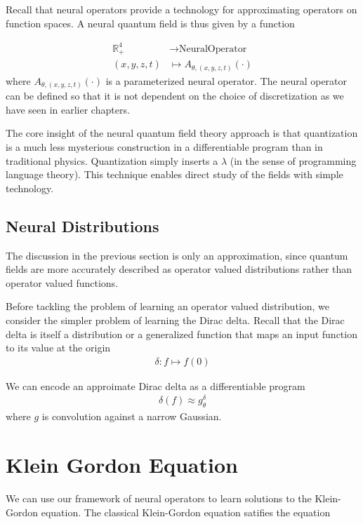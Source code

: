 \documentclass[book.tex]{subfiles}
\begin{document}
Recall that neural operators provide a technology for approximating operators on function spaces. A neural quantum field is thus given by a function

\begin{align}
    \mathbb{R}^4_+ &\to \textrm{NeuralOperator} \\
    (x, y, z, t) &\mapsto A_{\theta, (x,y,z, t)}(\cdot)
\end{align}
where $A_{\theta, (x,y,z, t)}(\cdot)$ is a parameterized neural operator. The neural operator can be defined so that it is not dependent on the choice of discretization as we have seen in earlier chapters.

The core insight of the neural quantum field theory approach is that quantization is a much less mysterious construction in a differentiable program than in traditional physics. Quantization simply inserts a $\lambda$ (in the sense of programming language theory). This technique enables direct study of the fields with simple technology.

\subsection{Neural Distributions}
The discussion in the previous section is only an approximation, since quantum fields are more accurately described as operator valued distributions rather than operator valued functions. 

Before tackling the problem of learning an operator valued distribution, we consider the simpler problem of learning the Dirac delta. Recall that the Dirac delta is itself a distribution or a generalized function that maps an input function to its value at the origin
\begin{align}
\delta: f \mapsto f(0)
\end{align}

We can encode an approimate Dirac delta as a differentiable program
\begin{align}
\delta(f) \approx g^{\delta}_\theta 
\end{align}
where $g$ is convolution against a narrow Gaussian.


\section{Klein Gordon Equation}
We can use our framework of neural operators to learn solutions to the Klein-Gordon equation. The classical Klein-Gordon equation satifies the equation
\end{document}

